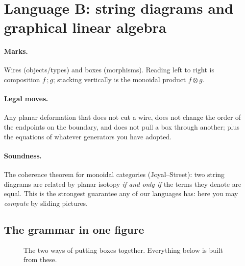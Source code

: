 \section{Language B: string diagrams and graphical linear algebra}
\label{sec:string}

\paragraph{Marks.} Wires (objects/types) and boxes (morphisms). Reading left to right is
composition $f\,;g$; stacking vertically is the monoidal product $f\otimes g$.
\paragraph{Legal moves.} Any planar deformation that does not cut a wire, does not change
the order of the endpoints on the boundary, and does not pull a box through another; plus
the equations of whatever generators you have adopted.
\paragraph{Soundness.} The coherence theorem for monoidal categories (Joyal--Street): two
string diagrams are related by planar isotopy \emph{if and only if} the terms they denote
are equal. This is the strongest guarantee any of our languages has: here you may
\emph{compute} by sliding pictures.

\subsection{The grammar in one figure}

\begin{figure}[H]
\centering
{}
\hspace{1.1cm}
\caption{The two ways of putting boxes together. Everything below is built from these.}
\label{fig:strgrammar}
\end{figure}

